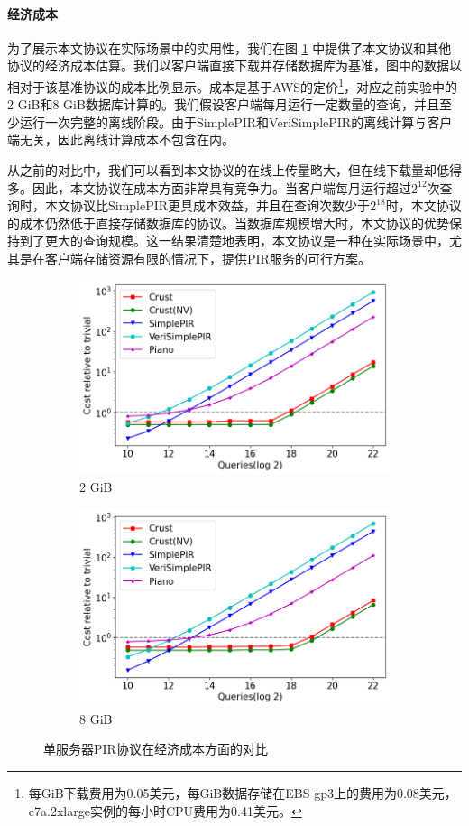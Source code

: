 \paragraph{经济成本}
为了展示本文协议在实际场景中的实用性，我们在图 \ref{fig:single-server-cost} 中提供了本文协议和其他协议的经济成本估算。我们以客户端直接下载并存储数据库为基准，图中的数据以相对于该基准协议的成本比例显示。成本是基于AWS的定价\footnote{每GiB下载费用为0.05美元，每GiB数据存储在EBS gp3上的费用为0.08美元，c7a.2xlarge实例的每小时CPU费用为0.41美元。}，对应之前实验中的2 GiB和8 GiB数据库计算的。我们假设客户端每月运行一定数量的查询，并且至少运行一次完整的离线阶段。由于SimplePIR和VeriSimplePIR的离线计算与客户端无关，因此离线计算成本不包含在内。

从之前的对比中，我们可以看到本文协议的在线上传量略大，但在线下载量却低得多。因此，本文协议在成本方面非常具有竞争力。当客户端每月运行超过$2^{12}$次查询时，本文协议比SimplePIR更具成本效益，并且在查询次数少于$2^{18}$时，本文协议的成本仍然低于直接存储数据库的协议。当数据库规模增大时，本文协议的优势保持到了更大的查询规模。这一结果清楚地表明，本文协议是一种在实际场景中，尤其是在客户端存储资源有限的情况下，提供PIR服务的可行方案。

\begin{figure}
    \begin{subfigure}{0.5\textwidth}
        \centering
        \includegraphics[width=0.8\linewidth]{figure/cost_2gb.png}
        \caption{2 GiB}
    \end{subfigure}%
    \begin{subfigure}{0.5\textwidth}
        \centering
        \includegraphics[width=0.8\linewidth]{figure/cost_8gb.png}
        \caption{8 GiB}
    \end{subfigure}%
    \caption{单服务器PIR协议在经济成本方面的对比}
    \label{fig:single-server-cost}
\end{figure}